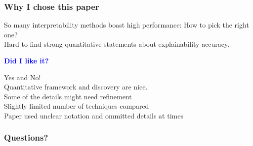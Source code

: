 \documentclass{beamer}
\theoremstyle{mystyle}
\begin{document}
\begin{frame}
\frametitle{Why I chose this paper}\pause
So many interpretability methods boast high performance: How to pick the right one? 
\\
Hard to find strong quantitative statements about explainability accuracy. \pause

\vspace{0.3cm}

    \textcolor{blue}{\textbf{\Large Did I like it?}} \pause
   
    \vspace{0.3cm}

    Yes and No! \\ \pause
    Quantitative framework and discovery are nice. \\ \pause
    Some of the details might need refinement \\ \pause
    Slightly limited number of techniques compared \\
    Paper used unclear notation and ommitted details at times
\end{frame}
\begin{frame}
	\frametitle{Questions?}
\end{frame}
\end{document}
